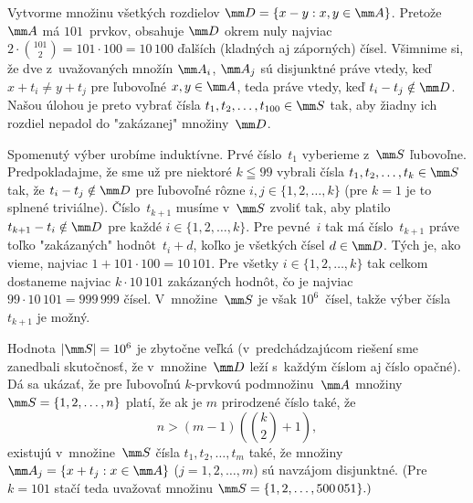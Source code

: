 {%
Vytvorme množinu všetkých rozdielov $\mm D=\{x-y: x,y\in\mm  A\}$.
Pretože $\mm A$ má $101$~prvkov, obsahuje $\mm D$ okrem nuly
najviac $2\cdot\binom{101}{2}=101\cdot100=10\,100$ ďalších
(kladných aj záporných) čísel. Všimnime si, že dve z~uvažovaných
množín $\mm A_i$, $\mm A_j$ sú disjunktné práve vtedy, keď $x+t_i\ne
y+t_j$ pre ľubovoľné $x,y\in\mm A$, teda práve vtedy, keď
$t_i-t_j\notin\mm D$. Našou úlohou je preto vybrať čísla
$t_1,t_2,\dots,t_{100}\in\mm S$ tak, aby žiadny ich rozdiel
nepadol do "zakázanej" množiny~$\mm D$.

Spomenutý výber urobíme induktívne. Prvé číslo~$t_1$ vyberieme 
z~$\mm S$ ľubovoľne. Predpokladajme, že sme už pre niektoré
$k\leqq99$ vybrali čísla $t_1,t_2,\dots,t_{k}\in\mm S$ tak, že
$t_i-t_{j}\notin\mm D$ pre ľubovoľné rôzne
$i,j\in\{1,2,\dots,k\}$ (pre $k=1$ je to splnené triviálne).
Číslo~$t_{k+1}$ musíme v~$\mm S$ zvoliť tak, aby platilo
$t_{k+1}-t_{i}\notin\mm  D$ pre každé $i\in\{1,2,\dots,k\}$. Pre
pevné~$i$ tak má číslo~$t_{k+1}$ práve toľko "zakázaných" hodnôt~$t_i+d$,
koľko je všetkých čísel $d\in\mm D$. Tých je, ako vieme,
najviac $1+101\cdot100=10\,101$. Pre všetky
$i\in\{1,2,\dots,k\}$ tak celkom dostaneme najviac
$k\cdot10\,101$ zakázaných hodnôt, čo je najviac
$99\cdot10\,101=999\,999$ čísel. V~množine~$\mm S$ je však $10^6$~čísel,
takže výber čísla~$t_{k+1}$ je možný.

\poznamka
Hodnota $|\mm S|=10^6$ je zbytočne veľká (v~predchádzajúcom riešení sme
zanedbali skutočnosť, že v~množine~$\mm D$ leží s~každým číslom 
aj číslo opačné). Dá sa ukázať, že pre ľubovoľnú $k$-prvkovú
podmnožinu~$\mm A$ množiny $\mm S=\{1,2,\dots,n\}$ platí, že ak je $m$
prirodzené číslo také, že
$$
n>(m-1)\left(\binom k2+1\right),
$$
existujú v~množine~$\mm S$ čísla $t_1,t_2,\dots,t_m$ také, že
množiny $\mm A_j=\{x+t_j:x\in\mm A\}$ ($j=1,2,\dots,m$) sú
navzájom disjunktné. (Pre $k=101$ stačí teda uvažovať množinu
$\mm S=\{1,2,\dots,500\,051\}.)$}

